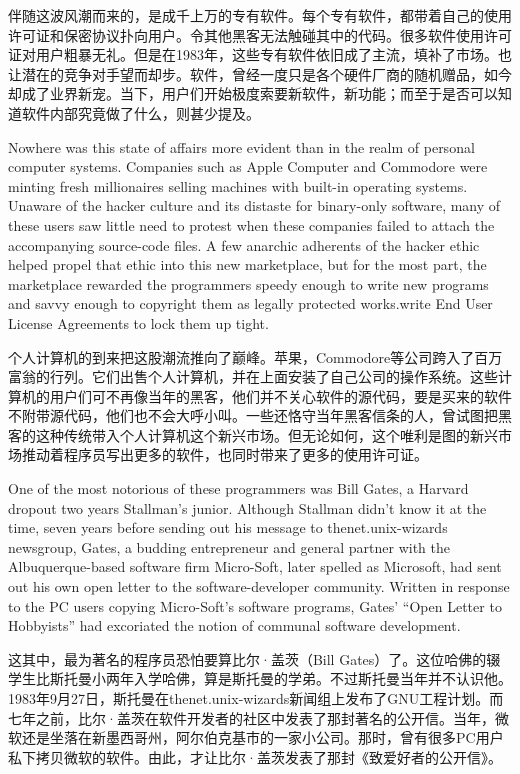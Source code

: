\ifdefined\chs
伴随这波风潮而来的，是成千上万的专有软件。每个专有软件，都带着自己的使用许可证和保密协议扑向用户。令其他黑客无法触碰其中的代码。很多软件使用许可证对用户粗暴无礼。但是在1983年，这些专有软件依旧成了主流，填补了市场。也让潜在的竞争对手望而却步。软件，曾经一度只是各个硬件厂商的随机赠品，如今却成了业界新宠。当下，用户们开始极度索要新软件，新功能；而至于是否可以知道软件内部究竟做了什么，则甚少提及。
\fi

\ifdefined\eng
Nowhere was this state of affairs more evident than in the realm of personal computer systems. Companies such as Apple Computer and Commodore were minting fresh millionaires selling machines with built-in operating systems. Unaware of the hacker culture and its distaste for binary-only software, many of these users saw little need to protest when these companies failed to attach the accompanying source-code files. A few anarchic adherents of the hacker ethic helped propel that ethic into this new marketplace, but for the most part, the marketplace rewarded the programmers speedy enough to write new programs and savvy enough to \ifdefined\vone copyright them as legally protected works.\fi\ifdefined\vtwo write End User License Agreements to lock them up tight.\fi
\fi

\ifdefined\chs
个人计算机的到来把这股潮流推向了巅峰。苹果，Commodore等公司跨入了百万富翁的行列。它们出售个人计算机，并在上面安装了自己公司的操作系统。这些计算机的用户们可不再像当年的黑客，他们并不关心软件的源代码，要是买来的软件不附带源代码，他们也不会大呼小叫。一些还恪守当年黑客信条的人，曾试图把黑客的这种传统带入个人计算机这个新兴市场。但无论如何，这个唯利是图的新兴市场推动着程序员写出更多的软件，也同时带来了更多的使用许可证。
\fi

\ifdefined\eng
One of the most notorious of these programmers was Bill Gates, a Harvard dropout two years Stallman's junior. Although Stallman didn't know it at the time, seven years before sending out his message to thenet.unix-wizards newsgroup, Gates, a budding entrepreneur and general partner with the Albuquerque-based software firm Micro-Soft, later spelled as Microsoft, had sent out his own open letter to the software-developer community. Written in response to the PC users copying Micro-Soft's software programs, Gates' ``Open Letter to Hobbyists'' had excoriated the notion of communal software development.
\fi

\ifdefined\chs
这其中，最为著名的程序员恐怕要算比尔·盖茨（Bill Gates）了。这位哈佛的辍学生比斯托曼小两年入学哈佛，算是斯托曼的学弟。不过斯托曼当年并不认识他。1983年9月27日，斯托曼在thenet.unix-wizards新闻组上发布了GNU工程计划。而七年之前，比尔·盖茨在软件开发者的社区中发表了那封著名的公开信。当年，微软还是坐落在新墨西哥州，阿尔伯克基市的一家小公司。那时，曾有很多PC用户私下拷贝微软的软件。由此，才让比尔·盖茨发表了那封《致爱好者的公开信》。
\fi

